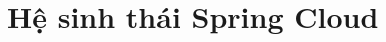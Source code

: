 \documentclass[../DoAn.tex]{subfiles}
\begin{document}




\section{Hệ sinh thái Spring Cloud}
\label{section:3.2}
\end{document}
